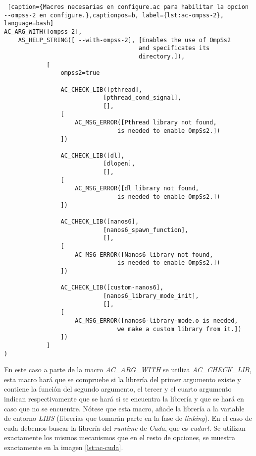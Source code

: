 \begin{lstlisting} [caption={Macros necesarias en configure.ac para habilitar la opcion --ompss-2 en configure.},captionpos=b, label={lst:ac-ompss-2}, language=bash]
AC_ARG_WITH([ompss-2],
    AS_HELP_STRING([ --with-ompss-2], [Enables the use of OmpSs2 
                                      and specificates its 
                                      directory.]),
            [
                ompss2=true

                AC_CHECK_LIB([pthread], 
                            [pthread_cond_signal], 
                            [],
                [
                    AC_MSG_ERROR([Pthread library not found, 
                                is needed to enable OmpSs2.])
                ])

                AC_CHECK_LIB([dl], 
                            [dlopen], 
                            [],
                [
                    AC_MSG_ERROR([dl library not found, 
                                is needed to enable OmpSs2.])
                ])

                AC_CHECK_LIB([nanos6], 
                            [nanos6_spawn_function], 
                            [],
                [
                    AC_MSG_ERROR([Nanos6 library not found, 
                                is needed to enable OmpSs2.])
                ])

                AC_CHECK_LIB([custom-nanos6], 
                            [nanos6_library_mode_init], 
                            [],
                [
                    AC_MSG_ERROR([nanos6-library-mode.o is needed, 
                                we make a custom library from it.])
                ])
            ]
)
\end{lstlisting}

En este caso a parte de la macro \textit{AC\_ARG\_WITH} se utiliza \textit{AC\_CHECK\_LIB}, esta macro hará que se compruebe si la librería del primer argumento existe y contiene la función del segundo argumento, el tercer y el cuarto argumento indican respectivamente que se hará si se encuentra la librería y que se hará en caso que no se encuentre. Nótese que esta macro, añade la librería a la variable de entorno \textit{LIBS} (librerías que tomarán parte en la fase de \textit{linking}). En el caso de cuda debemos buscar la librería del \textit{runtime} de \textit{Cuda}, que es \textit{cudart}. Se utilizan exactamente los mismos mecanismos que en el resto de opciones, se muestra exactamente en la imagen \ref{lst:ac-cuda}.
\par\smallskip

